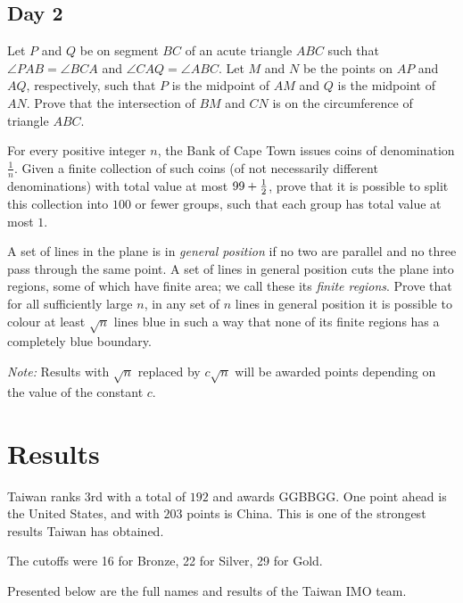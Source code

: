 \documentclass[11pt]{scrreprt}
\numberwithin{figure}{chapter}
\begin{document}
\section{Day 2}
\begin{problem}
  Let $P$ and $Q$ be on segment $BC$ of an acute triangle $ABC$ such that
  $\angle PAB=\angle BCA$ and $\angle CAQ=\angle ABC$.
  Let $M$ and $N$ be the points on $AP$ and $AQ$, respectively,
  such that $P$ is the midpoint of $AM$ and $Q$ is the midpoint of $AN$.
  Prove that the intersection of $BM$ and $CN$ is on the circumference of triangle $ABC$.
\end{problem}
\begin{problem}
  For every positive integer $n$, the Bank of Cape Town issues coins of denomination $\frac 1n$.
  Given a finite collection of such coins (of not necessarily different
  denominations) with total value at most $99 + \frac{1}{2}$,
  prove that it is possible to split this collection into $100$ or fewer groups,
  such that each group has total value at most $1$.
\end{problem}
\begin{problem}
  A set of lines in the plane is in \emph{general position} if no two are
  parallel and no three pass through the same point.
  A set of lines in general position cuts the plane into regions, some of which have finite area;
  we call these its \emph{finite regions}.
  Prove that for all sufficiently large $n$,
  in any set of $n$ lines in general position it is possible to colour at least
  $\sqrt{n}$ lines blue in such a way that none of its finite regions has a completely blue boundary.

  \emph{Note:} Results with $\sqrt{n}$ replaced by $c\sqrt{n}$ will be awarded points depending on the value of the constant $c$.
\end{problem}


\chapter{Results}
Taiwan ranks $3$rd with a total of $192$ and awards GGBBGG.
One point ahead is the United States, and with $203$ points is China.
This is one of the strongest results Taiwan has obtained.

The cutoffs were 16 for Bronze, 22 for Silver, 29 for Gold.

Presented below are the full names and results of the Taiwan IMO team.
\end{document}
